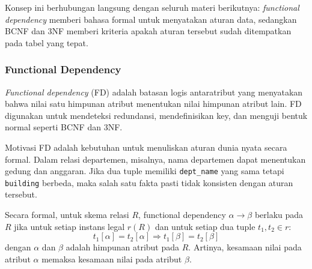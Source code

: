 Konsep ini berhubungan langsung dengan seluruh materi berikutnya: \textit{functional dependency} memberi bahasa formal untuk menyatakan aturan data, sedangkan BCNF dan 3NF memberi kriteria apakah aturan tersebut sudah ditempatkan pada tabel yang tepat.

\subsubsection{Functional Dependency}

\begin{jawab}
\textit{Functional dependency} (FD) adalah batasan logis antaratribut yang menyatakan bahwa nilai satu himpunan atribut menentukan nilai himpunan atribut lain. FD digunakan untuk mendeteksi redundansi, mendefinisikan key, dan menguji bentuk normal seperti BCNF dan 3NF.
\end{jawab}

Motivasi FD adalah kebutuhan untuk menuliskan aturan dunia nyata secara formal. Dalam relasi departemen, misalnya, nama departemen dapat menentukan gedung dan anggaran. Jika dua tuple memiliki \texttt{dept\_name} yang sama tetapi \texttt{building} berbeda, maka salah satu fakta pasti tidak konsisten dengan aturan tersebut.

Secara formal, untuk skema relasi \(R\), functional dependency \(\alpha \rightarrow \beta\) berlaku pada \(R\) jika untuk setiap instans legal \(r(R)\) dan untuk setiap dua tuple \(t_1,t_2 \in r\):
\begin{equation}
    t_1[\alpha] = t_2[\alpha] \Rightarrow t_1[\beta] = t_2[\beta]
    \label{eq:fd-definition}
\end{equation}
dengan \(\alpha\) dan \(\beta\) adalah himpunan atribut pada \(R\). Artinya, kesamaan nilai pada atribut \(\alpha\) memaksa kesamaan nilai pada atribut \(\beta\).

